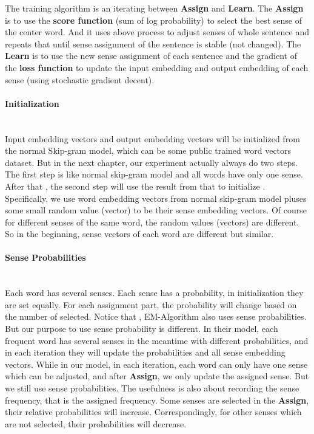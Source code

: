 The training algorithm is an iterating between \textbf{Assign} and \textbf{Learn}. The \textbf{Assign} is to use the \textbf{score function} (sum of log probability) to select the best sense of the center word. And it uses above process to adjust senses of whole sentence and repeats that until sense assignment of the sentence is stable (not changed). The \textbf{Learn} is to use the new sense assignment of each sentence and the gradient of the \textbf{loss function} to update the input embedding and output embedding of each sense (using stochastic gradient decent). 

\paragraph{Initialization}\ \\
Input embedding vectors and output embedding vectors will be initialized from the normal Skip-gram model, which can be some public trained word vectors dataset. But in the next chapter, our experiment actually always do two steps. The first step is like normal skip-gram model and all words have only one sense. After that , the second step will use the result from that to initialize . Specifically, we use word embedding vectors from normal skip-gram model pluses some small random value (vector) to be their sense embedding vectors. Of course for different senses of the same word, the random values (vectors) are different. So in the beginning, sense vectors of each word are different but similar.


\paragraph{Sense Probabilities}\ \\
Each word has several senses. Each sense has a probability, in initialization they are set equally. For each assignment part, the probability will change based on the number of selected. Notice that , EM-Algorithm also uses sense probabilities. But our purpose to use sense probability is different. In their model, each frequent word has several senses in the meantime  with different probabilities, and in each iteration they will update the probabilities and all sense embedding vectors. While in our model, in each iteration, each word can only have one sense which can be adjusted, and after \textbf{Assign}, we only update the assigned sense. But we still use sense probabilities. The usefulness is also about recording the sense frequency, that is the assigned frequency. Some senses are selected in the \textbf{Assign}, their relative probabilities will increase. Correspondingly, for other senses which are not selected, their probabilities will decrease. 

